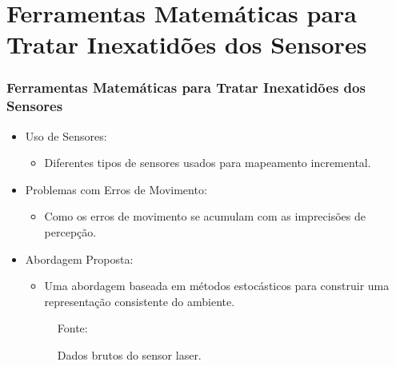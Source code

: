 \documentclass[xcolor=dvipsnames, aspectratio=169]{beamer}
\begin{document}
\section{Ferramentas Matemáticas para Tratar Inexatidões dos Sensores}
  \begin{frame}
  \frametitle{Ferramentas Matemáticas para Tratar Inexatidões dos Sensores}
  \begin{itemize}
      \item Uso de Sensores: 
      \begin{itemize}
        \item Diferentes tipos de sensores usados para mapeamento incremental.
      \end{itemize}
      \item Problemas com Erros de Movimento:
      \begin{itemize}
        \item Como os erros de movimento se acumulam com as imprecisões de percepção.
      \end{itemize}
      \item Abordagem Proposta:
      \begin{itemize}
        \item Uma abordagem baseada em métodos estocásticos para construir uma representação consistente do ambiente.
      \end{itemize}

      \begin{figure}
        \centering
        {Fonte: \cite{moutarlier2006experimental}}
        \caption{Dados brutos do sensor laser.}
        \label{fig:1_range_sensor_obstacle}
      \end{figure}
  \end{itemize}
\end{frame}
  
\end{document}
